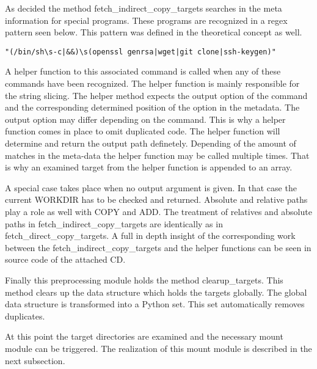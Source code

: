As decided the method fetch\_indirect\_copy\_targets searches in the meta information for special programs. 
These programs are recognized in a regex pattern seen below. 
This pattern was defined in the theoretical concept as well.
\begin{lstlisting}
"(/bin/sh\s-c|&&)\s(openssl genrsa|wget|git clone|ssh-keygen)"
\end{lstlisting}
A helper function to this associated command is called when any of these commands have been recognized. 
The helper function is mainly responsible for the string slicing.
The helper method expects the output option of the command and the corresponding determined position of the option in the metadata.
The output option may differ depending on the command. 
This is why a helper function comes in place to omit duplicated code. 
The helper function will determine and return the output path definetely.
Depending of the amount of matches in the meta-data the helper function may be called multiple times. 
That is why an examined target from the helper function is appended to an array. 

A special case takes place when no output argument is given. 
In that case the current WORKDIR has to be checked and returned.
Absolute and relative paths play a role as well with COPY and ADD. 
The treatment of relatives and absolute paths in fetch\_indirect\_copy\_targets are identically as in fetch\_direct\_copy\_targets.
A full in depth insight of the corresponding work between the fetch\_indirect\_copy\_targets and the helper functions can be seen in source code of the attached CD.

Finally this preprocessing module holds the method clearup\_targets. This method clears up the data structure which holds the targets globally. The global data structure is transformed into a Python set. This set automatically removes duplicates.
	
At this point the target directories are examined and the necessary mount module can be triggered. The realization of this mount module is described in the next subsection.

